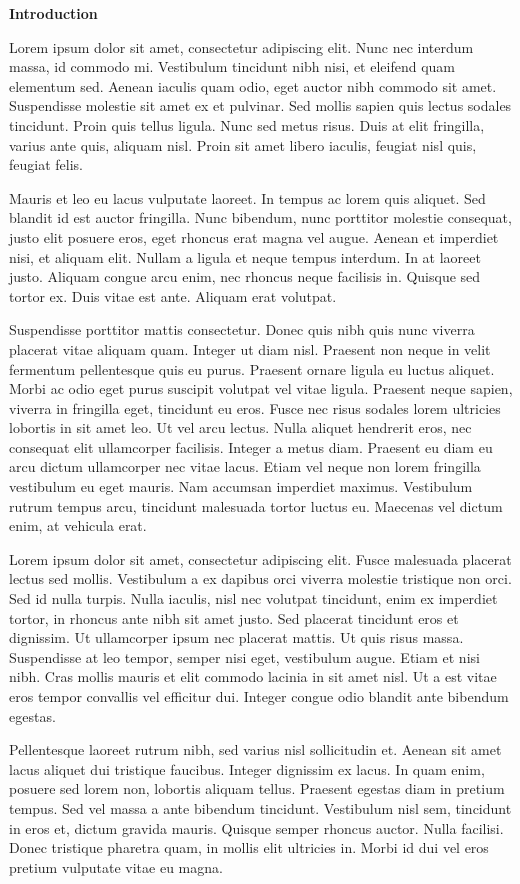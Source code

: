 \doublespacing
\noindent
{\fontsize{14}{16}\selectfont \textbf{Introduction}} 
\sloppy

Lorem ipsum dolor sit amet, consectetur adipiscing elit. Nunc nec interdum massa, id commodo mi. Vestibulum tincidunt nibh nisi, et eleifend quam elementum sed. Aenean iaculis quam odio, eget auctor nibh commodo sit amet. Suspendisse molestie sit amet ex et pulvinar. Sed mollis sapien quis lectus sodales tincidunt. Proin quis tellus ligula. Nunc sed metus risus. Duis at elit fringilla, varius ante quis, aliquam nisl. Proin sit amet libero iaculis, feugiat nisl quis, feugiat felis.

Mauris et leo eu lacus vulputate laoreet. In tempus ac lorem quis aliquet. Sed blandit id est auctor fringilla. Nunc bibendum, nunc porttitor molestie consequat, justo elit posuere eros, eget rhoncus erat magna vel augue. Aenean et imperdiet nisi, et aliquam elit. Nullam a ligula et neque tempus interdum. In at laoreet justo. Aliquam congue arcu enim, nec rhoncus neque facilisis in. Quisque sed tortor ex. Duis vitae est ante. Aliquam erat volutpat.

Suspendisse porttitor mattis consectetur. Donec quis nibh quis nunc viverra placerat vitae aliquam quam. Integer ut diam nisl. Praesent non neque in velit fermentum pellentesque quis eu purus. Praesent ornare ligula eu luctus aliquet. Morbi ac odio eget purus suscipit volutpat vel vitae ligula. Praesent neque sapien, viverra in fringilla eget, tincidunt eu eros. Fusce nec risus sodales lorem ultricies lobortis in sit amet leo. Ut vel arcu lectus. Nulla aliquet hendrerit eros, nec consequat elit ullamcorper facilisis. Integer a metus diam. Praesent eu diam eu arcu dictum ullamcorper nec vitae lacus. Etiam vel neque non lorem fringilla vestibulum eu eget mauris. Nam accumsan imperdiet maximus. Vestibulum rutrum tempus arcu, tincidunt malesuada tortor luctus eu. Maecenas vel dictum enim, at vehicula erat.

Lorem ipsum dolor sit amet, consectetur adipiscing elit. Fusce malesuada placerat lectus sed mollis. Vestibulum a ex dapibus orci viverra molestie tristique non orci. Sed id nulla turpis. Nulla iaculis, nisl nec volutpat tincidunt, enim ex imperdiet tortor, in rhoncus ante nibh sit amet justo. Sed placerat tincidunt eros et dignissim. Ut ullamcorper ipsum nec placerat mattis. Ut quis risus massa. Suspendisse at leo tempor, semper nisi eget, vestibulum augue. Etiam et nisi nibh. Cras mollis mauris et elit commodo lacinia in sit amet nisl. Ut a est vitae eros tempor convallis vel efficitur dui. Integer congue odio blandit ante bibendum egestas.

Pellentesque laoreet rutrum nibh, sed varius nisl sollicitudin et. Aenean sit amet lacus aliquet dui tristique faucibus. Integer dignissim ex lacus. In quam enim, posuere sed lorem non, lobortis aliquam tellus. Praesent egestas diam in pretium tempus. Sed vel massa a ante bibendum tincidunt. Vestibulum nisl sem, tincidunt in eros et, dictum gravida mauris. Quisque semper rhoncus auctor. Nulla facilisi. Donec tristique pharetra quam, in mollis elit ultricies in. Morbi id dui vel eros pretium vulputate vitae eu magna.

\fussy
